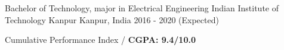 


\begin{cventries}


\cventry
{Bachelor of Technology, major in Electrical Engineering} %
{Indian Institute of Technology Kanpur} %
{Kanpur, India} %
{2016 - 2020 (Expected)} %
{%
\begin{cvitems}
\item {Cumulative Performance Index /
    \textbf{CGPA: 9.4/10.0}}
\end{cvitems}
}

\end{cventries}


